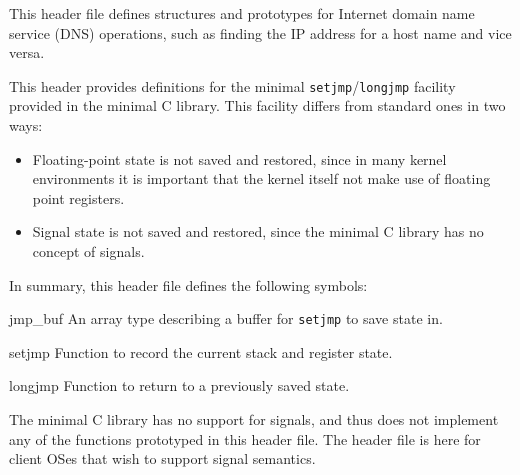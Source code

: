 \begin{apidesc}
	This header file defines structures and prototypes
	for Internet domain name service (DNS) operations,
	such as finding the IP address for a host name and vice versa.


\end{apidesc}

\label{setjmp-h}
\begin{apidesc}
	This header provides definitions
	for the minimal \texttt{setjmp}/\texttt{longjmp} facility
	provided in the minimal C library.
	This facility differs from standard ones in two ways:
	\begin{itemize}
	\item	Floating-point state is not saved and restored,
		since in many kernel environments
		it is important that the kernel itself
		not make use of floating point registers.
	\item	Signal state is not saved and restored,
		since the minimal C library
		has no concept of signals.
	\end{itemize}

	In summary, this header file defines the following symbols:
	\begin{icsymlist}
	\item[jmp_buf]
		An array type describing a buffer
		for \texttt{setjmp} to save state in.
	\item[setjmp]
		Function to record the current stack and register state.
	\item[longjmp]
		Function to return to a previously saved state.
	\end{icsymlist}
\end{apidesc}

\label{signal-h}
\begin{apidesc}
	The minimal
	C library has no support for signals, and thus
	does not implement any of the functions prototyped 
	in this header file. 
	The header file is here for client OSes that wish to
	support \posix{} signal semantics.

\end{apidesc}

